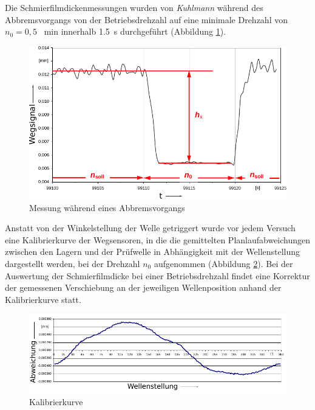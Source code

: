 Die Schmierfilmdickenmessungen wurden von \textit{Kuhlmann} während des Abbremsvorgangs von der Betriebsdrehzahl auf eine minimale Drehzahl von $n_0 = 0,5$ \si{\per\minute} innerhalb \SI{1.5}{\second} durchgeführt (Abbildung \ref{fig:differenzmessung_kuhlmann}).
\begin{figure}[htb]
    \centering
    \includegraphics[]{./images/differenzmessung_kuhlmann.pdf}
    \caption{Messung während eines Abbremsvorgangs \cite{kuhlmann_2009}}
    \label{fig:differenzmessung_kuhlmann}
\end{figure}
%

Anstatt von der Winkelstellung der Welle getriggert wurde vor jedem Versuch eine Kalibrierkurve der Wegsensoren, in die die gemittelten Planlaufabweichungen zwischen den Lagern und der Prüfwelle in Abhängigkeit mit der Wellenstellung dargestellt werden, bei der Drehzahl $n_0$ aufgenommen (Abbildung \ref{fig:kalibrierkurve_kuhlmann}).
Bei der Auswertung der Schmierfilmdicke bei einer Betriebsdrehzahl findet eine Korrektur der gemessenen Verschiebung an der jeweiligen Wellenposition anhand der Kalibrierkurve statt.
\begin{figure}[htb]
    \centering
    \includegraphics[]{./images/kalibrierkurve_kuhlmann.pdf}
    \caption{Kalibrierkurve \cite{kuhlmann_2009}}
    \label{fig:kalibrierkurve_kuhlmann}
\end{figure}
%

